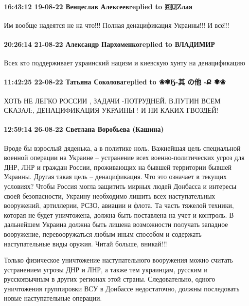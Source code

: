 \paragraph{16:43:12 19-08-22 Венцеслав Алексеевreplied to 🇷🇺Zлая}

Им вообще надеятся не на что!!! Полная денацификация Украины!!! И всё!!!

\paragraph{20:26:14 21-08-22 Александр Пархоменкоreplied to ВЛАДИМИР}

Всех кто поддерживает украинский нацизм и киевскую хунту на денацификацию

\paragraph{11:42:25 22-08-22 Татьяна Соколоваreplied to ❀✾Ӄ-其 の他 -Ք ✾❀}

ХОТЬ НЕ ЛЕГКО РОССИИ ,
ЗАДАЧИ -ПОТРУДНЕЙ.
В.ПУТИН ВСЕМ СКАЗАЛ:,
ДЕНАЦИФИКАЦИЯ УКРАИНЫ !
И НИ КАКИХ ГВОЗДЕЙ!

\paragraph{12:59:14 26-08-22 Светлана Воробьева (Кашина)}

Вроде  бы взрослый дяденька, а в политике  ноль. Важнейшая цель специальной военной операции на Украине – устранение всех военно-политических угроз для ДНР, ЛНР и граждан России, проживающих на бывшей территории бывшей Украины. Другая такая цель – денацификация. Что это означает в текущих условиях?
Чтобы Россия могла защитить мирных людей Донбасса и интересы своей безопасности, Украину необходимо лишить всех наступательных вооружений, артиллерии, РСЗО, авиации и флота. Та часть тяжелой техники, которая не будет уничтожена, должна быть поставлена на учет и контроль. В дальнейшем Украина должна быть лишена возможности получать западное вооружение, перевооружаться любым иным способом и содержать наступательные виды оружия.
Читай больше, вникай!!!

Только физическое уничтожение наступательного вооружения можно считать устранением угрозы ДНР и ЛНР, а также тем украинцам, русским и русскоязычным в других регионах этой страны. Следовательно, одного уничтожения группировки ВСУ в Донбассе недостаточно, должны последовать новые наступательные операции.
